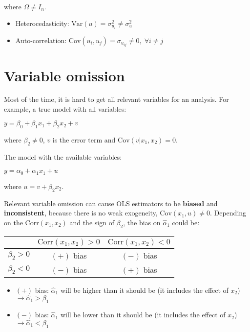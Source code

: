 \documentclass[10pt, a4paper, landscape]{article}
\newcommand{\Var}{\mathrm{Var}}
\newcommand{\Cov}{\mathrm{Cov}}
\newcommand{\Corr}{\mathrm{Corr}}
\begin{document}
\begin{multicols}{3}
		\quad where $\Omega \neq I_{n}$.
		
		\begin{itemize}[leftmargin=*]
			\item Heterocedasticity: $\Var(u) = \sigma^{2}_{u_i} \neq \sigma^{2}_{u}$
			\item Auto-correlation: $\Cov(u_{i}, u_{j}) = \sigma_{u_{ij}} \neq 0, \; \forall i \neq j$
		\end{itemize}
		
		\section*{Variable omission}
		
		Most of the time, it is hard to get all relevant variables for an analysis. For example, a true model with all variables:
		
		\begin{center}
			$y = \beta_{0} + \beta_{1} x_{1} + \beta_{2} x_{2} + v$
		\end{center}
		
		\quad where $\beta_{2} \neq 0$, $v$ is the error term and $\Cov(v|x_{1},x_{2}) = 0$.
		
		The model with the available variables:
		
		\begin{center}
			$y = \alpha_{0} + \alpha_{1} x_{1} + u$
		\end{center}
		
		\quad where $u = v + \beta_{2} x_{2}$.
		
		Relevant variable omission can cause OLS estimators to be \textbf{biased} and \textbf{inconsistent}, because there is no weak exogeneity, $\Cov(x_{1}, u) \neq 0$. Depending on the $\Corr(x_{1}, x_{2})$ and the sign of $\beta_{2}$, the bias on $\hat{\alpha}_{1}$ could be:
		
		\begin{center}
			\begin{tabular}{ c | c c }
				                & $\Corr(x_{1}, x_{2}) > 0$ & $\Corr(x_{1}, x_{2}) < 0$ \\ \hline
				$\beta_{2} > 0$ & $(+)$ bias                & $(-)$ bias                \\
				$\beta_{2} < 0$ & $(-)$ bias                & $(+)$ bias
			\end{tabular}
		\end{center}
		
		\begin{itemize}[leftmargin=*]
			\item $(+)$ bias: $\hat{\alpha}_{1}$ will be higher than it should be (it includes the effect of $x_{2}$) $\rightarrow \hat{\alpha}_{1} > \beta_{1}$
			\item $(-)$ bias: $\hat{\alpha}_{1}$ will be lower than it should be (it includes the effect of $x_{2}$) $\rightarrow \hat{\alpha}_{1} < \beta_{1}$
		\end{itemize}
		

\end{multicols}
\end{document}
